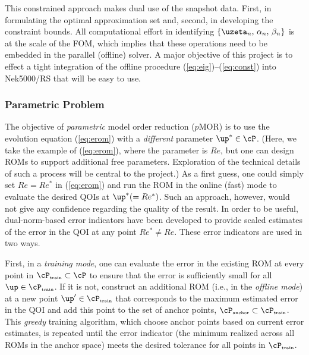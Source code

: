 This constrained approach makes dual use of the snapshot data.  First, in
formulating the optimal approximation set and, second, in developing the
constraint bounds.   All computational effort in identifying 
$\{\uzeta_n,\, \alpha_n,\, \beta_n \}$ is at the scale of the FOM, which
implies that these operations need to be embedded in the parallel
(offline) solver.  A major objective of this project is to effect a 
tight integration of the offline procedure (\ref{eq:eig})--(\ref{eq:const})
into Nek5000/RS that will be easy to use.


\vspace*{.1in}
\subsubsection*{Parametric Problem}
The objective of {\em parametric} model order reduction ($p$MOR) is to use the
evolution equation (\ref{eq:erom}) with a {\em different} parameter $\up^* \in
\cP$.  (Here, we take the example of (\ref{eq:erom}), where the parameter is
$Re$, but one can design ROMs to support additional free parameters.
Exploration of the technical details of such a process will be central to the
project.)  As a first guess, one could simply set $Re=Re^*$ in (\ref{eq:erom})
and run the ROM in the online (fast) mode to evaluate the desired QOIs at
$\up^*  (=Re^*)$.  Such an approach, however, would not give any confidence
regarding the quality of the result.  In order to be useful, dual-norm-based
error indicators have been developed to provide scaled estimates of the
error in the QOI at any point $Re^* \neq Re$.  These error indicators are used
in two ways.  

First, in a {\em training mode}, one can evaluate the error in the existing ROM
at every point in $\cP_{\mbox{\tiny train}} \subset \cP$ to ensure that the error is
sufficiently small for all $\up \in \cP_{\mbox{\tiny train}}$.   If it is not,
construct an additional ROM (i.e., in the {\em offline mode}) at a new point
$\up' \in \cP_{\mbox{\tiny train}}$ that corresponds to the maximum estimated error
in the QOI and add this point to the set of anchor points, $\cP_{\mbox{\tiny anchor}}
\subset \cP_{\mbox{\tiny train}}$.  This {\em greedy} training algorithm, which
choose anchor points based on current error estimates, is repeated until the
error indicator (the minimum realized across all ROMs in the anchor
space) meets the desired tolerance for all points in $\cP_{\mbox{\tiny train}}$.

